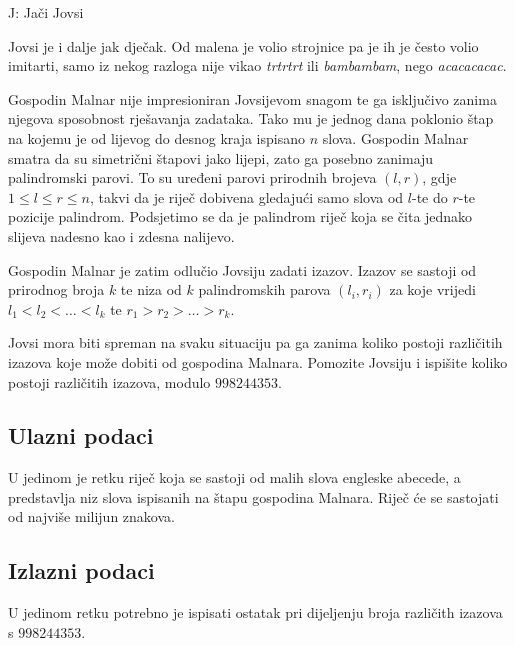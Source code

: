\begin{statement}[
  timelimit=1 s,
  memorylimit=512 MiB,
]{J: Jači Jovsi}

Jovsi je i dalje jak dječak. Od malena je volio strojnice pa je ih je često
volio imitarti, samo iz nekog razloga nije vikao \textit{trtrtrt} ili
\textit{bambambam}, nego \textit{acacacacac}.

Gospodin Malnar nije impresioniran Jovsijevom snagom te ga isključivo zanima
njegova sposobnost
rješavanja zadataka. Tako mu je jednog dana poklonio štap na kojemu je od
lijevog do desnog kraja ispisano $n$ slova. Gospodin Malnar smatra da su simetrični
štapovi jako lijepi, zato ga posebno zanimaju palindromski parovi. To su uređeni
parovi prirodnih brojeva $(l, r)$, gdje $1 \le l \le r \le n$, takvi da je riječ
dobivena gledajući samo slova od $l$-te do $r$-te pozicije palindrom.
Podsjetimo se da je palindrom riječ koja se čita jednako slijeva nadesno kao i
zdesna nalijevo.

Gospodin Malnar je zatim odlučio Jovsiju zadati izazov. Izazov se sastoji od prirodnog
broja $k$ te niza od $k$ palindromskih parova $(l_i, r_i)$ za koje vrijedi
$l_1 < l_2 < \dots < l_k$ te $r_1 > r_2 > \dots > r_k$.

Jovsi mora biti spreman na svaku situaciju pa ga zanima koliko postoji
različitih izazova koje može dobiti od gospodina Malnara. Pomozite Jovsiju i
ispišite koliko postoji različitih izazova, modulo $998244353$.

\subsection*{Ulazni podaci}
U jedinom je retku riječ koja se sastoji od malih slova engleske abecede, a
predstavlja niz slova ispisanih na štapu gospodina Malnara. Riječ će se sastojati
od najviše milijun znakova.

\subsection*{Izlazni podaci}
U jedinom retku potrebno je ispisati ostatak pri dijeljenju broja različith
izazova s $998244353$.


\end{statement}
